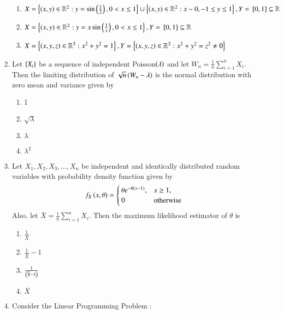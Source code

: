\documentclass[journal]{IEEEtran}
\begin{document}
\begin{enumerate}
\begin{enumerate}
	\item $X=\left\{\left(x,y\right)\in \mathbb{R}^2 : y=\sin\left(\frac{1}{2}\right),0<x\le 1\right\}\cup \left\{\left(x,y\right)\in \mathbb{R}^2: x-0,-1\le y \le 1\right\},Y={}\left[0,1\right]\subseteq \mathbb{R}$
	\item $X=\left\{\left(x,y\right)\in \mathbb{R}^2:y=x\sin\left(\frac{1}{x}\right),0<x \le 1\right\}, Y={}\left[0,1\right]\subseteq \mathbb{R}$
	\item $X=\left\{\left(x,y,z\right)\in \mathbb{R}^3 : x^2+y^2=1\right\}, Y=\left\{\left(x,y,z\right)\in \mathbb{R}^3: x^2+y^2=z^2\neq0\right\}$
\end{enumerate}
\item Let $\left\{X_i\right\}$ be a sequence of independent Poisson$\left(\lambda\right)$ and let $W_n=\frac{1}{n}\sum_{i=1}^n X_i$. Then the limiting distribution of $\sqrt{n}\left(W_n-\lambda\right)$ is the normal distribution with zero mean and variance given by 
\begin{multicols}{4}
    \begin{enumerate}
        \item 1
        \item $\sqrt{\lambda}$
        \item $\lambda$
        \item $\lambda^2$
    \end{enumerate}
\end{multicols}
\item Let $X_1,X_2,X_3,\dots,X_n$ be independent and identically distributed random variables with probability density function given by 
\begin{align*}
    f_X\left(x,\theta\right)=
    \begin{cases}
        \theta e^{-\theta\left(x-1\right)}, & x \ge 1,\\ 0 & \text{otherwise} 
    \end{cases}
\end{align*}
Also, let $\overline{X}=\frac{1}{n}\sum_{i=1}^nX_i$. Then the maximum likelihood estimator of $\theta$ is 
\begin{multicols}{4}
    \begin{enumerate}
        \item $\frac{1}{\overline{X}}$
        \item $\frac{1}{\overline{X}}-1$
        \item $\frac{1}{\left(\overline{X}-1\right)}$
        \item $\overline{X}$
    \end{enumerate}
\end{multicols}
\item Consider the Linear Programming Problem :\\

\end{enumerate}
\end{document}
